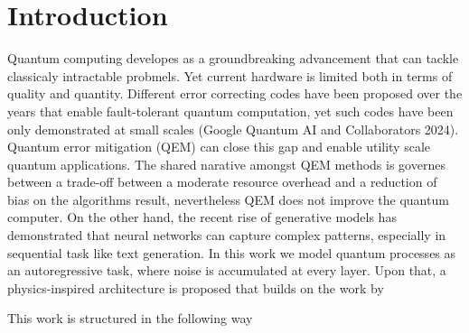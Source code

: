 \section{Introduction}
\label{sec:intro}

Quantum computing developes as a groundbreaking advancement that can tackle classicaly intractable probmels. 
Yet current hardware is limited both in terms of quality and quantity. Different error correcting codes have been proposed over the years that 
enable fault-tolerant quantum computation, yet such codes have been only demonstrated at small scales (Google Quantum AI and Collaborators 2024). Quantum error mitigation (QEM) can close this gap 
and enable utility scale quantum applications. The shared narative amongst QEM methods \cite{RevModPhys.95.045005} is governes between a trade-off between a moderate
resource overhead and a reduction of bias on the algorithms result, nevertheless QEM does not improve the quantum computer. On the other hand, the recent rise of generative models has demonstrated
that neural networks can capture complex patterns, especially in sequential task like text generation. In this work we model quantum processes as an autoregressive task, where noise is accumulated
at every layer. Upon that, a physics-inspired architecture is proposed that builds on the work by 

This work is structured in the following way